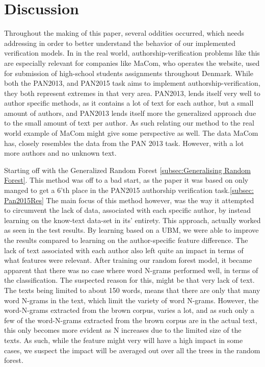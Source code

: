 \section{Discussion}
Throughout the making of this paper, several oddities occurred, which
needs addressing in order to better understand the behavior of our implemented
verification models. 
In in the real world, authorship-verification problems 
like this are especially relevant for companies like MaCom, who
operates the website, used for submission of high-school students assignments
throughout Denmark. 
While both the PAN2013, and PAN2015 task aims to implement 
authorship-verification, they both represent extremes in that very area. 
PAN2013, lends itself very well to author specific methods, as it contains
a lot of text for each author, but a small amount of authors, and PAN2013
lends itself more the generalized approach due to the small amount of text
per author.
As such relating our method to the real world example of MaCom might give some 
perspective as well. The data MaCom has, closely resembles the data from the
PAN 2013 task. However, with a lot more authors and no unknown text.


Starting off with the Generalized Random Forest 
\ref{subsec:Generalising Random Forest}. This method was off to a bad
start, as the paper it was based on \cite{pacheco2015} only manged to
get a 6'th place in the PAN2015 authorship verification task.\ref{subsec: Pan2015Res}
The main focus of this method however, was the way it attempted to circumvent 
the lack of data, associated with each specific author, by instead learning on
the know-text data-set in its' entirety. 
This approach, actually worked as seen in the test results. By learning based on
a \gls{UBM}, we were able to improve the results compared to learning
on the author-specific feature difference.
The lack of text associated with each author also left quite an impact in
terms of what features were relevant. After training our random forest
model, it became apparent that there was no case where word N-grams performed
well, in terms of the classification. The suspected reason for this, might
be that very lack of text. The texts being limited to about 150 words, 
means that there are only that many word N-grams in the text, which limit
the variety of word N-grams. However, the word-N-grams extracted from the brown
corpus, varies a lot, and as such only a few of the word-N-grams extracted from
the brown corpus are in the actual text, this only becomes more evident as N
increases due to the limited size of the texts. 
As such, while the feature might very will have a high impact in some
cases, we suspect the impact will be averaged out over all the trees in the 
random forest.

